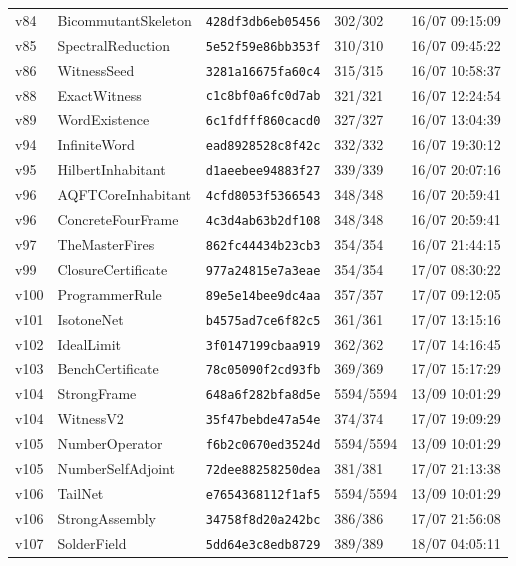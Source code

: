 \documentclass[11pt]{article}
\theoremstyle{definition}\newtheorem{deriv}{Derivation}
\begin{document}
{\begin{longtable}{@{}lllll@{}}
v84 & BicommutantSkeleton & \texttt{428df3db6eb05456} & 302/302 & 16/07 09:15:09 \\
v85 & SpectralReduction & \texttt{5e52f59e86bb353f} & 310/310 & 16/07 09:45:22 \\
v86 & WitnessSeed & \texttt{3281a16675fa60c4} & 315/315 & 16/07 10:58:37 \\
v88 & ExactWitness & \texttt{c1c8bf0a6fc0d7ab} & 321/321 & 16/07 12:24:54 \\
v89 & WordExistence & \texttt{6c1fdfff860cacd0} & 327/327 & 16/07 13:04:39 \\
v94 & InfiniteWord & \texttt{ead8928528c8f42c} & 332/332 & 16/07 19:30:12 \\
v95 & HilbertInhabitant & \texttt{d1aeebee94883f27} & 339/339 & 16/07 20:07:16 \\
v96 & AQFTCoreInhabitant & \texttt{4cfd8053f5366543} & 348/348 & 16/07 20:59:41 \\
v96 & ConcreteFourFrame & \texttt{4c3d4ab63b2df108} & 348/348 & 16/07 20:59:41 \\
v97 & TheMasterFires & \texttt{862fc44434b23cb3} & 354/354 & 16/07 21:44:15 \\
v99 & ClosureCertificate & \texttt{977a24815e7a3eae} & 354/354 & 17/07 08:30:22 \\
v100 & ProgrammerRule & \texttt{89e5e14bee9dc4aa} & 357/357 & 17/07 09:12:05 \\
v101 & IsotoneNet & \texttt{b4575ad7ce6f82c5} & 361/361 & 17/07 13:15:16 \\
v102 & IdealLimit & \texttt{3f0147199cbaa919} & 362/362 & 17/07 14:16:45 \\
v103 & BenchCertificate & \texttt{78c05090f2cd93fb} & 369/369 & 17/07 15:17:29 \\
v104 & StrongFrame & \texttt{648a6f282bfa8d5e} & 5594/5594 & 13/09 10:01:29 \\
v104 & WitnessV2 & \texttt{35f47bebde47a54e} & 374/374 & 17/07 19:09:29 \\
v105 & NumberOperator & \texttt{f6b2c0670ed3524d} & 5594/5594 & 13/09 10:01:29 \\
v105 & NumberSelfAdjoint & \texttt{72dee88258250dea} & 381/381 & 17/07 21:13:38 \\
v106 & TailNet & \texttt{e7654368112f1af5} & 5594/5594 & 13/09 10:01:29 \\
v106 & StrongAssembly & \texttt{34758f8d20a242bc} & 386/386 & 17/07 21:56:08 \\
v107 & SolderField & \texttt{5dd64e3c8edb8729} & 389/389 & 18/07 04:05:11 \\

\end{longtable}}
\end{document}
